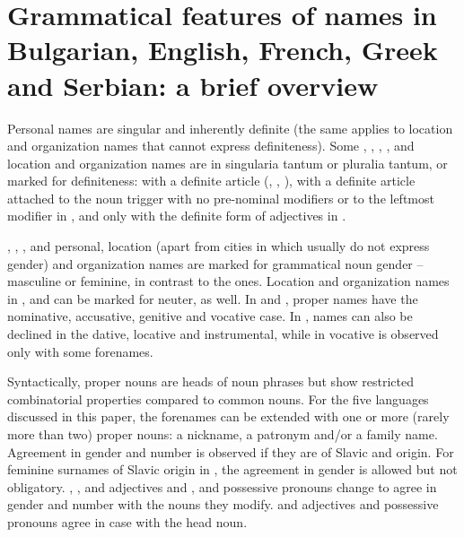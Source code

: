 \documentclass[output=paper]{langsci/langscibook}
\begin{document}

\section{Grammatical features of names in {Bulgarian}, {English}, {French}, {Greek} and {Serbian}: a brief overview}

Personal names are singular and inherently definite (the same applies to
location and organization names that cannot express definiteness). Some
, , , , and  location and
organization names are in singularia tantum or pluralia tantum, or
marked for definiteness: with a definite article (, ,
), with a definite article attached to the noun trigger with no
pre-nominal modifiers or to the leftmost modifier in , and
only with the definite form of adjectives in .



, , , and  personal, location (apart from
cities in  which usually do not express gender) and organization
names are marked for grammatical noun gender – masculine or feminine,
in contrast to the  ones. Location and organization names in
,  and  can be marked for neuter, as well. In
 and , proper names have the nominative, accusative,
genitive and vocative case. In , names can also be declined in
the dative, locative and instrumental, while in  vocative is
observed only with some forenames.



Syntactically, proper nouns are heads of noun phrases but show
restricted combinatorial properties compared to common nouns. For the
five languages discussed in this paper, the forenames can be extended
with one or more (rarely more than two) proper nouns: a nickname, a
patronym and/or a family name. Agreement in gender and number is
observed if they are of Slavic and  origin. For feminine surnames
of Slavic origin in , the agreement in gender is allowed but not
obligatory. , ,  and  adjectives and
,  and  possessive pronouns change to agree in
gender and number with the nouns they modify.  and 
adjectives and possessive pronouns agree in case with the head noun.
\end{document}
